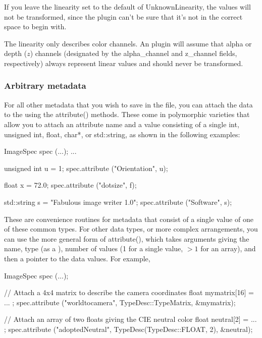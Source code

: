 If you leave the linearity set to the default of {\cf UnknownLinearity},
the values will not be transformed, since the plugin can't be sure that
it's not in the correct space to begin with.  

The linearity only describes color channels.  An \ImageOutput plugin
will assume that alpha or depth ($z$) channels (designated by the {\cf
  alpha_channel} and {\cf z_channel} fields, respectively) always
represent linear values and should never be transformed.


\subsubsection{Arbitrary metadata}

For all other metadata that you wish to save in the file, you can attach
the data to the \ImageSpec using the {\cf attribute()} methods.
These come in polymorphic varieties that allow you to attach an
attribute name and a value consisting of a single {\cf int}, {\cf
  unsigned int}, {\cf float}, {\cf char*}, or {\cf std::string}, as
shown in the following examples:

\begin{code}
        ImageSpec spec (...);
        ...

        unsigned int u = 1;
        spec.attribute ("Orientation", u);

        float x = 72.0;
        spec.attribute ("dotsize", f);

        std::string s = "Fabulous image writer 1.0";
        spec.attribute ("Software", s);
\end{code}

These are convenience routines for metadata that consist of a single
value of one of these common types.  For other data types, or more
complex arrangements, you can use the more general form of {\cf
  attribute()}, which takes arguments giving the name, type (as a
\TypeDesc), number of values (1 for a single value, $>1$ for an
  array), and then a pointer to the data values.  For example,

\begin{code}
        ImageSpec spec (...);

        // Attach a 4x4 matrix to describe the camera coordinates
        float mymatrix[16] = { ... };
        spec.attribute ("worldtocamera", TypeDesc::TypeMatrix, &mymatrix);

        // Attach an array of two floats giving the CIE neutral color
        float neutral[2] = { ... };
        spec.attribute ("adoptedNeutral", TypeDesc(TypeDesc::FLOAT, 2), &neutral);
\end{code}

